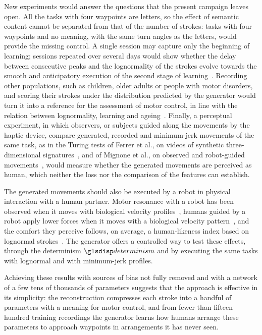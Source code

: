 \documentclass[12pt]{report}
\begin{document}
New experiments would answer the questions that the present campaign leaves open. All the tasks with four waypoints are letters, so the effect of semantic content cannot be separated from that of the number of strokes: tasks with four waypoints and no meaning, with the same turn angles as the letters, would provide the missing control. A single session may capture only the beginning of learning; sessions repeated over several days would show whether the delay between consecutive peaks and the lognormality of the strokes evolve towards the smooth and anticipatory execution of the second stage of learning~\cite[pp.~34--38, 56--58]{senatore2012}. Recording other populations, such as children, older adults or people with motor disorders, and scoring their strokes under the distribution predicted by the generator would turn it into a reference for the assessment of motor control, in line with the relation between lognormality, learning and ageing~\cite{plamondon2013}. Finally, a perceptual experiment, in which observers, or subjects guided along the movements by the haptic device, compare generated, recorded and minimum-jerk movements of the same task, as in the Turing tests of Ferrer et al., on videos of synthetic three-dimensional signatures~\cite{ferrer2023onair}, and of Mignone et al., on observed and robot-guided movements~\cite{touchvsvision}, would measure whether the generated movements are perceived as human, which neither the loss nor the comparison of the features can establish.

The generated movements should also be executed by a robot in physical interaction with a human partner. Motor resonance with a robot has been observed when it moves with biological velocity profiles~\cite{kupferberg2011,bisio2014}, humans guided by a robot apply lower forces when it moves with a biological velocity pattern~\cite{maurice2018}, and the comfort they perceive follows, on average, a human-likeness index based on lognormal strokes~\cite{coccaro}. The generator offers a controlled way to test these effects, through the determinism $\sym{determinism}$ and by executing the same tasks with lognormal and with minimum-jerk profiles.

Achieving these results with sources of bias not fully removed and with a network of a few tens of thousands of parameters suggests that the approach is effective in its simplicity: the reconstruction compresses each stroke into a handful of parameters with a meaning for motor control, and from fewer than fifteen hundred training recordings the generator learns how humans arrange these parameters to approach waypoints in arrangements it has never seen.
\end{document}
